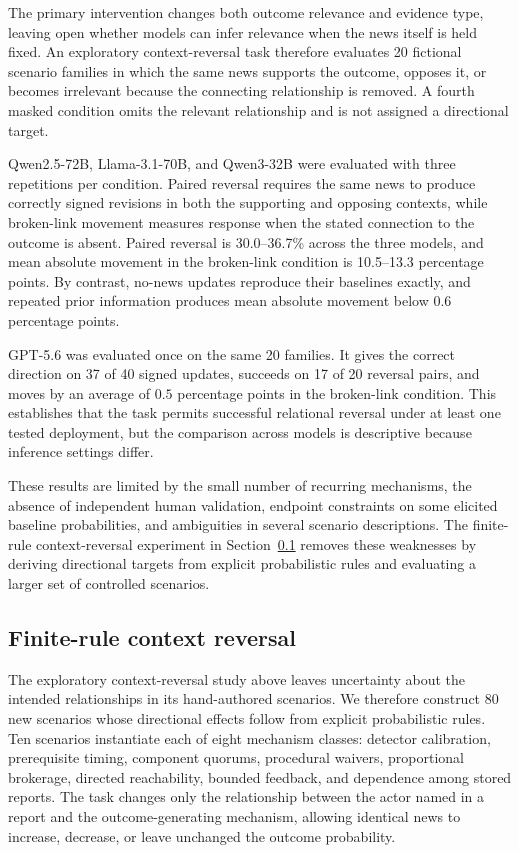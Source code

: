 The primary intervention changes both outcome relevance and evidence type, leaving open whether models can infer relevance when the news itself is held fixed.
An exploratory context-reversal task therefore evaluates 20 fictional scenario families in which the same news supports the outcome, opposes it, or becomes irrelevant because the connecting relationship is removed.
A fourth masked condition omits the relevant relationship and is not assigned a directional target.

Qwen2.5-72B, Llama-3.1-70B, and Qwen3-32B were evaluated with three repetitions per condition.
Paired reversal requires the same news to produce correctly signed revisions in both the supporting and opposing contexts, while broken-link movement measures response when the stated connection to the outcome is absent.
Paired reversal is 30.0--36.7\% across the three models, and mean absolute movement in the broken-link condition is 10.5--13.3 percentage points.
By contrast, no-news updates reproduce their baselines exactly, and repeated prior information produces mean absolute movement below $0.6$ percentage points.

GPT-5.6 was evaluated once on the same 20 families.
It gives the correct direction on 37 of 40 signed updates, succeeds on 17 of 20 reversal pairs, and moves by an average of $0.5$ percentage points in the broken-link condition.
This establishes that the task permits successful relational reversal under at least one tested deployment, but the comparison across models is descriptive because inference settings differ.

These results are limited by the small number of recurring mechanisms, the absence of independent human validation, endpoint constraints on some elicited baseline probabilities, and ambiguities in several scenario descriptions.
The finite-rule context-reversal experiment in Section~\ref{app:exp1-fresh-factorial} removes these weaknesses by deriving directional targets from explicit probabilistic rules and evaluating a larger set of controlled scenarios.

\subsection{Finite-rule context reversal}
\label{app:exp1-fresh-factorial}

The exploratory context-reversal study above leaves uncertainty about the intended relationships in its hand-authored scenarios.
We therefore construct 80 new scenarios whose directional effects follow from explicit probabilistic rules.
Ten scenarios instantiate each of eight mechanism classes: detector calibration, prerequisite timing, component quorums, procedural waivers, proportional brokerage, directed reachability, bounded feedback, and dependence among stored reports.
The task changes only the relationship between the actor named in a report and the outcome-generating mechanism, allowing identical news to increase, decrease, or leave unchanged the outcome probability.

